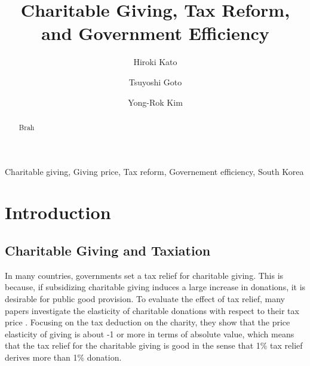 \documentclass[ review  , 3p ]{elsarticle}
\begin{document}
  \begin{frontmatter}

    \title{Charitable Giving, Tax Reform, and Government Efficiency}
                \author[Osaka University]{
      Hiroki Kato 
       \corref{*} }
        \author[Chiba University]{
      Tsuyoshi Goto 
      }
        \author[Kobe University]{
      Yong-Rok Kim 
      }
            \address[Osaka University]{Graduate School of Economics, Osaka University, Japan}
        \address[Chiba University]{Graduate School of Economics, Chiba University, Japan}
        \address[Kobe University]{Graduate School of Economics, Kobe University, Japan}
      
        \begin{abstract}
      Brah
    \end{abstract}
      
        \begin{keyword}
      Charitable giving, Giving price, Tax reform, Governement efficiency, South Korea
    \end{keyword}
    
  \end{frontmatter}

  \hypertarget{introduction}{%
  \section{Introduction}\label{introduction}}
  
  \hypertarget{charitable-giving-and-taxiation}{%
  \subsection{Charitable Giving and Taxiation}\label{charitable-giving-and-taxiation}}
  
  In many countries, governments set a tax relief for charitable giving. This is because, if subsidizing charitable giving induces a large increase in donations, it is desirable for public good provision. To evaluate the effect of tax relief, many papers investigate the elasticity of charitable donations with respect to their tax price \citep{Randolph1995, Auten2002, Fack2010, Bakija2011, Almunia2020}. Focusing on the tax deduction on the charity, they show that the price elasticity of giving is about -1 or more in terms of absolute value, which means that the tax relief for the charitable giving is good in the sense that 1\% tax relief derives more than 1\% donation.
  
\end{document}
